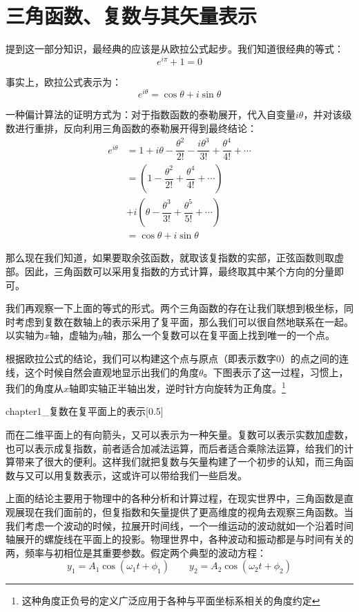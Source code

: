 \section[三角函数、复数与其矢量表示]{三角函数、复数与其矢量表示}
提到这一部分知识，最经典的应该是从欧拉公式起步。我们知道很经典的等式：
\[e^{i\pi} + 1 = 0\]

事实上，欧拉公式表示为：
\[e^{i\theta} = \cos\theta + i\sin\theta\]

一种偏计算法的证明方式为：对于指数函数的泰勒展开，代入自变量$i\theta$，并对该级数进行重排，反向利用三角函数的泰勒展开得到最终结论：
\begin{align*}
    e^{i\theta} &= 1 + i\theta - \dfrac{\theta^2}{2!} - \dfrac{i\theta^3}{3!} + \dfrac{\theta^4}{4!} + \cdots\\
    &= (1 - \dfrac{\theta^2}{2!} + \dfrac{\theta^4}{4!} + \cdots)\\
    &+ i(\theta - \dfrac{\theta^3}{3!} + \dfrac{\theta^5}{5!} + \cdots)\\
    &= \cos\theta + i\sin\theta
\end{align*}

那么现在我们知道，如果要取余弦函数，就取该复指数的实部，正弦函数则取虚部。因此，三角函数可以采用复指数的方式计算，最终取其中某个方向的分量即可。

我们再观察一下上面的等式的形式。两个三角函数的存在让我们联想到极坐标，同时考虑到复数在数轴上的表示采用了复平面，那么我们可以很自然地联系在一起。以实轴为$x$轴，虚轴为$y$轴，那么一个复数可以在复平面上找到唯一的一个点。

根据欧拉公式的结论，我们可以构建这个点与原点（即表示数字0）的点之间的连线，这个时候自然会直观地显示出我们的角度$\theta$。下图表示了这一过程，习惯上，我们的角度从$x$轴即实轴正半轴出发，逆时针方向旋转为正角度。\footnote{这种角度正负号的定义广泛应用于各种与平面坐标系相关的角度约定}

\begin{singlefigure}[复数在复平面上的表示]{chapter1_复数在复平面上的表示}[0.5]
\end{singlefigure}

而在二维平面上的有向箭头，又可以表示为一种矢量。复数可以表示实数加虚数，也可以表示成复指数，前者适合加减法运算，而后者适合乘除法运算，给我们的计算带来了很大的便利。这样我们就把复数与矢量构建了一个初步的认知，而三角函数与又可以用复数表示，这或许可以带给我们一些启发。

上面的结论主要用于物理中的各种分析和计算过程，在现实世界中，三角函数是直观展现在我们面前的，但复指数和矢量提供了更高维度的视角去观察三角函数。当我们考虑一个波动的时候，拉展开时间线，一个一维运动的波动就如一个沿着时间轴展开的螺旋线在平面上的投影。物理世界中，各种波动和振动都是与时间有关的两，频率与初相位是其重要参数。假定两个典型的波动方程：
\[y_1 = A_1 \cos (\omega_1 t + \phi_1)\qquad y_2 = A_2 \cos (\omega_2 t + \phi_2)\]

